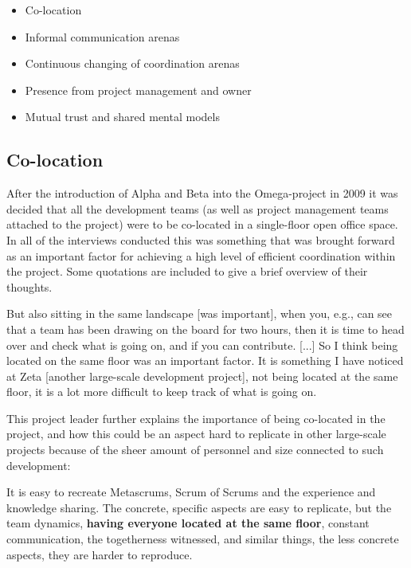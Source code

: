 \begin{itemize}
   \item Co-location
   \item Informal communication arenas
   \item Continuous changing of coordination arenas
   \item Presence from project management and owner
   \item Mutual trust and shared mental models
\end{itemize}

\subsection{Co-location}

After the introduction of Alpha and Beta into the Omega-project in 2009 it was decided that all the development teams (as well as project management teams attached to the project) were to be co-located in a single-floor open office space. In all of the interviews conducted this was something that was brought forward as an important factor for achieving a high level of efficient coordination within the project. Some quotations are included to give a brief overview of their thoughts.

\begin{fancyquotes}
But also sitting in the same landscape [was important], when you, e.g., can see that a team has been drawing on the board for two hours, then it is time to head over and check what is going on, and if you can contribute. [...] So I think being located on the same floor was an important factor. It is something I have noticed at Zeta [another large-scale development project], not being located at the same floor, it is a lot more difficult to keep track of what is going on. 
\end{fancyquotes}

This project leader further explains the importance of being co-located in the project, and how this could be an aspect hard to replicate in other large-scale projects because of the sheer amount of personnel and size connected to such development:

\begin{fancyquotes}
It is easy to recreate Metascrums, Scrum of Scrums and the experience and knowledge sharing. The concrete, specific aspects are easy to replicate, but the team dynamics, \textbf{having everyone located at the same floor}, constant communication, the togetherness witnessed, and similar things, the less concrete aspects, they are harder to reproduce.
\end{fancyquotes}

